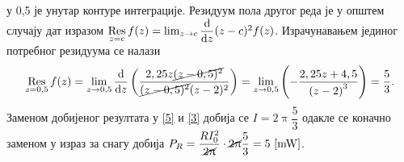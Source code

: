 у 0,5 је унутар контуре интеграције.
Резидуум пола другог реда је у 
општем случају дат изразом 
$\underset{z = c}{\operatorname{Res}}\, f(z) 
= \lim_{z\to c} \dfrac{{\rm d}}{{\rm d} z} (z-c)^2 f(z)$. 
Израчунавањем јединог потребног резидуума се 
налази
\begin{equation}
\underset{z = 0,5}{\operatorname{Res}}\,
 f(z) = \lim_{z \to 0,5} 
 \dfrac{{\rm d}}{{\rm d} z} \left(
 \dfrac{2,25 z \cancel{(z-0,5)^2} }{
\cancel{(z-0,5)^2}(z - 2)^2
}	
 \right)
 =
 \lim_{z \to 0,5} 
 \left(
 - \frac{2,25 z + 4,5}{\left(z - 2\right)^{3}}
 \right)
 = \dfrac{5}{3}.
\end{equation}
Заменом добијеног резултата у \eqref{5} и
 \eqref{3} добија се
$I = 2\uppi \dfrac{5}{3}$ одакле се коначно заменом
у израз за снагу добија $P_R = \dfrac{RI_0^2}
{\cancel{2\uppi}} \cdot \cancel{2\uppi} \dfrac{5}{3}
= 5\,\left[\mathrm{mW}\right]$.

